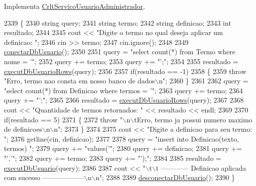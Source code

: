 Implementa \mbox{\hyperlink{class_crlt_servico_usuario_administrador_a7212381b97babb06c887847980a19d81}{Crlt\+Servico\+Usuario\+Administrador}}.


\begin{DoxyCode}
2339     \{
2340       \textcolor{keywordtype}{string} query;
2341       \textcolor{keywordtype}{string} termo;
2342       \textcolor{keywordtype}{string} definicao;
2343       \textcolor{keywordtype}{int} resultado;
2344 
2345       cout << \textcolor{stringliteral}{"Digite o termo no qual deseja aplicar um definicao: "};
2346       cin >> termo;
2347       cin.ignore();
2348 
2349       \mbox{\hyperlink{comando_sql_8cpp_a4f89ddcbc4cf8f2587d89f72f8c7900d}{conectarDbUsuario}}();
2350 
2351       query = \textcolor{stringliteral}{"select count(*) from Termo where nome = '"};
2352       query += termo;
2353       query += \textcolor{stringliteral}{"';"};
2354 
2355       resultado = \mbox{\hyperlink{comando_sql_8cpp_af54952694f2fa7d76f969fb74b853cb9}{executDbUsuarioRows}}(query);
2356 
2357       \textcolor{keywordflow}{if}(resultado == -1)
2358       \{
2359         \textcolor{keywordflow}{throw} \textcolor{stringliteral}{"Erro, termo nao consta em nosso banco de dados\(\backslash\)n"};
2360       \}
2361 
2362       query = \textcolor{stringliteral}{"select count(*) from Definicao where termos = '"};
2363       query += termo;
2364       query += \textcolor{stringliteral}{"';"};
2365 
2366       resultado = \mbox{\hyperlink{comando_sql_8cpp_af54952694f2fa7d76f969fb74b853cb9}{executDbUsuarioRows}}(query);
2367 
2368       cout << \textcolor{stringliteral}{"Quantidade de termos retornados: "} << resultado << endl;
2369 
2370       \textcolor{keywordflow}{if}(resultado == 5)
2371       \{
2372         \textcolor{keywordflow}{throw} \textcolor{stringliteral}{"\(\backslash\)n\(\backslash\)tErro, termo ja possui numero maximo de definicoes\(\backslash\)n\(\backslash\)n"};
2373       \}
2374 
2375       cout << \textcolor{stringliteral}{"Digite a definicao para seu termo: "};
2376       getline(cin, definicao);
2377 
2378       query = \textcolor{stringliteral}{"insert into Definicao(texto, termos) "};
2379       query += \textcolor{stringliteral}{"values('"};
2380       query += definicao;
2381       query += \textcolor{stringliteral}{"','"};
2382       query += termo;
2383       query += \textcolor{stringliteral}{"');"};
2384 
2385       resultado = \mbox{\hyperlink{comando_sql_8cpp_a748197580e7f9acdbf48c78de1f7924b}{executDbUsuario}}(query);
2386 
2387       cout << \textcolor{stringliteral}{"\(\backslash\)t\(\backslash\)t ------------ Definicao aplicada com sucesso ------------------\(\backslash\)n\(\backslash\)n"};
2388 
2389       \mbox{\hyperlink{comando_sql_8cpp_a969be9911913568e30d4ae8963338bc3}{desconectarDbUsuario}}();
2390     \}
\end{DoxyCode}
\mbox{\label{class_servico_usuarios_administrador_a87f2dca2e2b3858f663b4220f357d26f}} 
